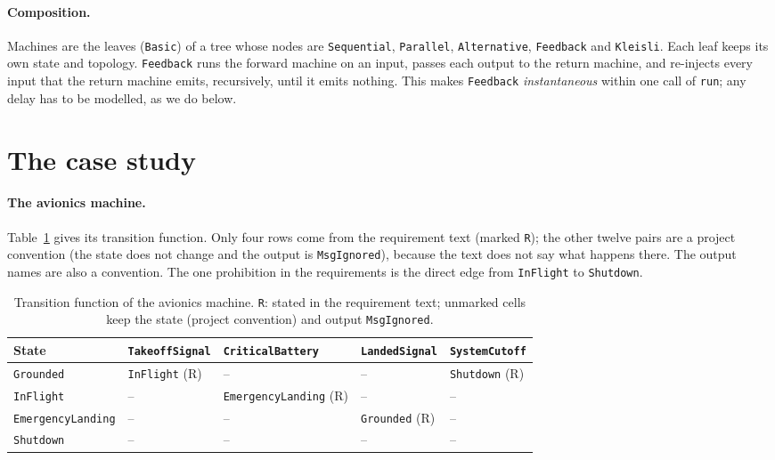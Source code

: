 \documentclass[review]{jfp-epi}
\newcommand{\code}[1]{\texttt{#1}}
\begin{document}
\paragraph{Composition.} Machines are the leaves (\code{Basic}) of a tree whose nodes are \code{Sequential}, \code{Parallel}, \code{Alternative}, \code{Feedback} and \code{Kleisli}. Each leaf keeps its own state and topology. \code{Feedback} runs the forward machine on an input, passes each output to the return machine, and re-injects every input that the return machine emits, recursively, until it emits nothing. This makes \code{Feedback} \emph{instantaneous} within one call of \code{run}; any delay has to be modelled, as we do below.

\section{The case study}
\label{sec:case}

\paragraph{The avionics machine.} Table~\ref{tab:delta} gives its transition function. Only four rows come from the requirement text (marked \texttt{R}); the other twelve pairs are a project convention (the state does not change and the output is \code{MsgIgnored}), because the text does not say what happens there. The output names are also a convention. The one prohibition in the requirements is the direct edge from \code{InFlight} to \code{Shutdown}.

\begin{table}[t]
\caption{Transition function of the avionics machine. \texttt{R}: stated in the requirement text; unmarked cells keep the state (project convention) and output \code{MsgIgnored}.}
\label{tab:delta}
\footnotesize
\setlength{\tabcolsep}{3pt}
\begin{tabular}{@{}lllll@{}}
\toprule
State & \code{TakeoffSignal} & \code{CriticalBattery} & \code{LandedSignal} & \code{SystemCutoff} \\
\midrule
\code{Grounded}         & \code{InFlight} (R) & -- & -- & \code{Shutdown} (R) \\
\code{InFlight}         & -- & \code{EmergencyLanding} (R) & -- & -- \\
\code{EmergencyLanding} & -- & -- & \code{Grounded} (R) & -- \\
\code{Shutdown}         & -- & -- & -- & -- \\
\bottomrule
\end{tabular}
\end{table}
\end{document}
